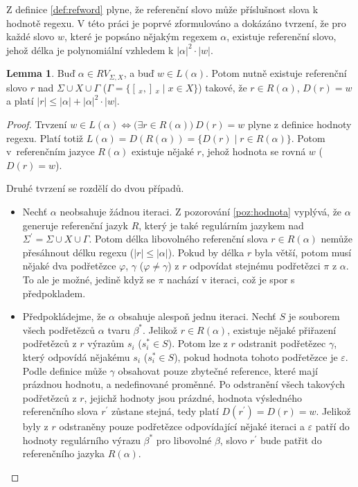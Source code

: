 \documentclass[thesis=B,czech]{FITthesis}[2019/12/23]
\theoremstyle{definition}
\newtheorem{lemma}{Lemma}[chapter]
\begin{document}
Z definice \ref{def:refword} plyne, že referenční slovo může  příslušnost slova k hodnotě regexu. V této práci je poprvé zformulováno a dokázáno tvrzení, že pro každé slovo $w$, které je popsáno nějakým regexem $\alpha$, existuje referenční slovo, jehož délka je polynomiální vzhledem k $|\alpha|^2\cdot|w|$.

\begin{lemma}\label{lem:ref1}
Buď $\alpha \in RV_{\Sigma, X}$, a buď $w \in L(\alpha)$. Potom nutně existuje referenční slovo $r$ nad $\Sigma\cup X \cup\Gamma$ ($\Gamma = \{ [\,_x , ]\,_x \mid x \in X \}$) takové, že $r \in R(\alpha)$, $D(r) = w$ a platí $|r| \le |\alpha|+|\alpha|^2\cdot|w|$.
\end{lemma}

\begin{proof} Trvzení $w \in L(\alpha) \iff \bigg(\exists r \in R(\alpha)\bigg) \ D(r) = w$ plyne z definice hodnoty regexu. Platí totiž $L(\alpha)=D(R(\alpha))=\{D(r) \mid r \in R(\alpha)\}$. Potom v~referenčním jazyce $R(\alpha)$ existuje nějaké $r$, jehož hodnota se rovná $w$ ($D(r)=w$).  

Druhé tvrzení se rozdělí do dvou případů. 
 \begin{itemize}
	\item{Nechť $\alpha$ neobsahuje žádnou iteraci. Z pozorování \ref{poz:hodnota} vyplývá, že $\alpha$ generuje referenční jazyk $R$, který je také regulárním jazykem nad $\Sigma^\prime = \Sigma \cup X \cup \Gamma$. Potom délka libovolného referenční slova $r \in R(\alpha)$ nemůže přesáhnout délku regexu ($|r| \leq |\alpha|$). Pokud by délka $r$ byla větší, potom musí nějaké dva podřetězce $\varphi$, $\gamma$ ($\varphi \ne \gamma$) z $r$ odpovídat stejnému podřetězci $\pi$ z $\alpha$. To ale je možné, jedině když se $\pi$ nachází v iteraci, což je spor s předpokladem.}
	\item{Předpokládejme, že $\alpha$ obsahuje alespoň jednu iteraci. Nechť $S$ je souborem všech podřetězců $\alpha$ tvaru $\beta^\ast$. Jelikož $r \in R(\alpha)$, existuje nějaké přiřazení podřetězců z $r$ výrazům $s_i$ ($s_i^\ast \in S$). Potom lze z $r$ odstranit podřetězec $\gamma$, který odpovídá nějakému $s_i$ ($s_i^\ast \in S$), pokud hodnota tohoto podřetězce je $\varepsilon$. Podle definice může $\gamma$ obsahovat pouze zbytečné reference, které mají prázdnou hodnotu, a nedefinované proměnné. Po odstranění všech takových podřetězců z $r$, jejichž hodnoty jsou prázdné, hodnota výsledného referenčního slova $r^\prime$ zůstane stejná, tedy platí $D(r^\prime)=D(r)=w$. Jelikož byly z $r$ odstraněny pouze podřetězce odpovídající nějaké iteraci a $\varepsilon$ patří do hodnoty regulárního výrazu $\beta^\ast$ pro libovolné $\beta$, slovo $r^\prime$ bude patřit do referenčního jazyka $R(\alpha)$.  

}
\end{itemize}
\end{proof}
\end{document}
